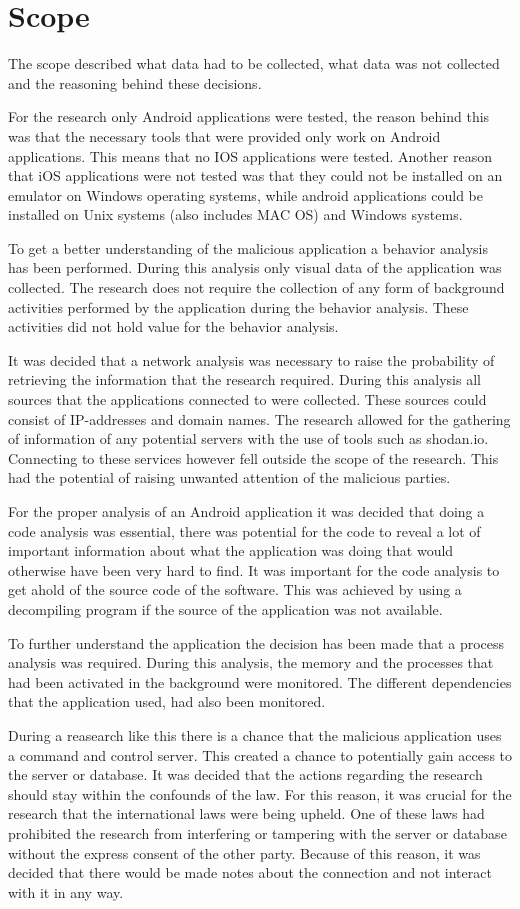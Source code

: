 \section{Scope}

The scope described what data had to be collected, what data was not collected and the reasoning behind these decisions.

For the research only Android applications were tested, the reason behind this was that the necessary tools that were provided only work on Android applications.
This means that no IOS applications were tested.
Another reason that iOS applications were not tested was that they could not be installed on an emulator on Windows operating systems,
while android applications could be installed on Unix systems (also includes MAC OS) and Windows systems.

To get a better understanding of the malicious application a behavior analysis has been performed.
During this analysis only visual data of the application was collected.
The research does not require the collection of any form of background activities performed by the application during the behavior analysis.
These activities did not hold value for the behavior analysis.

It was decided that a network analysis was necessary to raise the probability of retrieving the information that the research required.
During this analysis all sources that the applications connected to were collected. These sources could consist of IP-addresses and domain names.
The research allowed for the gathering of information of any potential servers with the use of tools such as shodan.io.
Connecting to these services however fell outside the scope of the research. This had the potential of raising unwanted attention of the malicious parties.

For the proper analysis of an Android application it was decided that doing a code analysis was essential,
there was potential for the code to reveal a lot of important information about what the application was doing that would otherwise have been very hard to find.
It was important for the code analysis to get ahold of the source code of the software.
This was achieved by using a decompiling program if the source of the application was not available.

To further understand the application the decision has been made that a process analysis was required.
During this analysis, the memory and the processes that had been activated in the background were monitored.
The different dependencies that the application used, had also been monitored.

During a reasearch like this there is a chance that the malicious application uses a command and control server.
This created a chance to potentially gain access to the server or database. It was decided that the actions regarding the research should stay within the confounds of the law.
For this reason, it was crucial for the research that the international laws were being upheld.
One of these laws had prohibited the research from interfering or tampering with the server or database without the express consent of the other party.
Because of this reason, it was decided that there would be made notes about the connection and not interact with it in any way.
